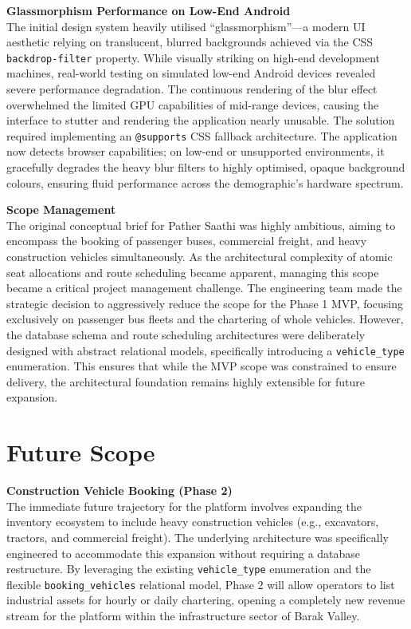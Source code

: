 \documentclass[12pt,a4paper]{report}
\begin{document}
\textbf{Glassmorphism Performance on Low-End Android}\\
The initial design system heavily utilised ``glassmorphism''---a modern UI aesthetic relying on translucent, blurred backgrounds achieved via the CSS \texttt{backdrop-filter} property. While visually striking on high-end development machines, real-world testing on simulated low-end Android devices revealed severe performance degradation. The continuous rendering of the blur effect overwhelmed the limited GPU capabilities of mid-range devices, causing the interface to stutter and rendering the application nearly unusable. The solution required implementing an \texttt{@supports} CSS fallback architecture. The application now detects browser capabilities; on low-end or unsupported environments, it gracefully degrades the heavy blur filters to highly optimised, opaque background colours, ensuring fluid performance across the demographic's hardware spectrum.

\textbf{Scope Management}\\
The original conceptual brief for Pather Saathi was highly ambitious, aiming to encompass the booking of passenger buses, commercial freight, and heavy construction vehicles simultaneously. As the architectural complexity of atomic seat allocations and route scheduling became apparent, managing this scope became a critical project management challenge. The engineering team made the strategic decision to aggressively reduce the scope for the Phase 1 MVP, focusing exclusively on passenger bus fleets and the chartering of whole vehicles. However, the database schema and route scheduling architectures were deliberately designed with abstract relational models, specifically introducing a \texttt{vehicle\_type} enumeration. This ensures that while the MVP scope was constrained to ensure delivery, the architectural foundation remains highly extensible for future expansion.

\chapter{Future Scope}

\textbf{Construction Vehicle Booking (Phase 2)}\\
The immediate future trajectory for the platform involves expanding the inventory ecosystem to include heavy construction vehicles (e.g., excavators, tractors, and commercial freight). The underlying architecture was specifically engineered to accommodate this expansion without requiring a database restructure. By leveraging the existing \texttt{vehicle\_type} enumeration and the flexible \texttt{booking\_vehicles} relational model, Phase 2 will allow operators to list industrial assets for hourly or daily chartering, opening a completely new revenue stream for the platform within the infrastructure sector of Barak Valley.
\end{document}
